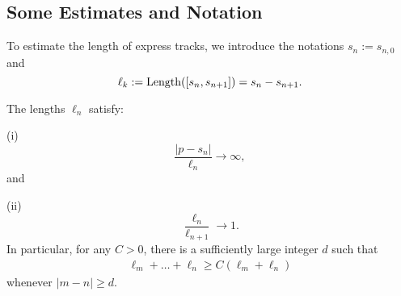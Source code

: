 \subsection{Some Estimates and Notation}

To estimate the length of express tracks, we introduce the notations $s_n := s_{n, 0}$ and 
\begin{equation}
	\ell_k := \operatorname{Length}([s_{n},s_{n+1}]) = s_{n}-s_{n+1}.
\end{equation}

\begin{lemma} \label{lem-ell_n}
	The lengths ${\ell_n}$ satisfy:
	
	(i) 
	\begin{equation}
		\frac {|p-s_n|}{\ell_n} \to \infty,
	\end{equation}
	and 
	
	(ii)
	\begin{equation}
		\frac{\ell_n}{\ell_{n+1}} \to 1.
	\end{equation}
	In particular, for any $C > 0$, there is a sufficiently large integer $d$ such that
	\begin{align*}
		\ell_{m}+\ldots+\ell_{n} \geq C (\ell_m+\ell_n)
	\end{align*}
	whenever $|m-n| \geq d$.
\end{lemma}

